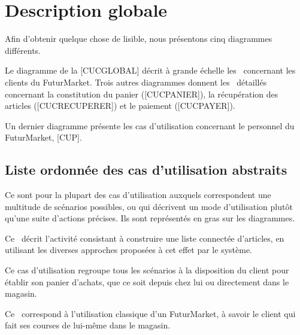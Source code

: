 \section{Description globale}

Afin d'obtenir quelque chose de lisible, nous présentons cinq diagrammes différents.
\par
Le diagramme de la [CUCGLOBAL] décrit à grande échelle les \cu\ concernant les clients du FuturMarket.
Trois autres diagrammes donnent les \cu\ détaillés concernant la constitution du panier ([CUCPANIER]), la récupération des articles ([CUCRECUPERER]) et le paiement ([CUCPAYER]).
\par
Un dernier diagramme présente les cas d'utilisation concernant le personnel du FuturMarket, [CUP].


\subsection{Liste ordonnée des cas d'utilisation abstraits}

Ce sont pour la plupart des cas d'utilisation auxquels correspondent une multitude de scénarios possibles, ou qui décrivent un mode d'utilisation plutôt qu'une suite d'actions précises.
Ils sont représentés en gras sur les diagrammes.

Ce \cu\ décrit l'activité consistant à construire une liste connectée d'articles, en utilisant les diverses approches proposées à cet effet par le système.

Ce cas d'utilisation regroupe tous les scénarios à la disposition du client pour établir son panier d'achats, que ce soit depuis chez lui ou directement dans le magasin.

Ce \cu\ correspond à l'utilisation classique d'un FuturMarket, à savoir le client qui fait ses courses de lui-même dans le magasin.

